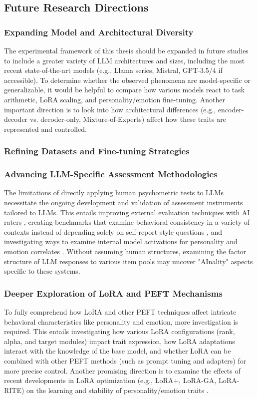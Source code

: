 \documentclass{DESSThesis}
\begin{document}
\subsection{Future Research Directions}

\subsubsection{Expanding Model and Architectural Diversity}
The experimental framework of this thesis should be expanded in future studies to include a greater variety of LLM architectures and sizes, including the most recent state-of-the-art models (e.g., Llama series, Mistral, GPT-3.5/4 if accessible). To determine whether the observed phenomena are model-specific or generalizable, it would be helpful to compare how various models react to task arithmetic, LoRA scaling, and personality/emotion fine-tuning. Another important direction is to look into how architectural differences (e.g., encoder-decoder vs. decoder-only, Mixture-of-Experts) affect how these traits are represented and controlled.

\subsubsection{Refining Datasets and Fine-tuning Strategies}


\subsubsection{Advancing LLM-Specific Assessment Methodologies}
The limitations of directly applying human psychometric tests to LLMs necessitate the ongoing development and validation of assessment instruments tailored to LLMs. This entails improving external evaluation techniques with AI raters \cite{zheng_lmlpa_2024}, creating benchmarks that examine behavioral consistency in a variety of contexts instead of depending solely on self-report style questions \cite{lee_llms_2024}, and investigating ways to examine internal model activations for personality and emotion correlates \cite{allbert_identifying_2025}. Without assuming human structures, examining the factor structure of LLM responses to various item pools may uncover "AInality" aspects specific to these systems.

\subsubsection{Deeper Exploration of LoRA and PEFT Mechanisms}
To fully comprehend how LoRA and other PEFT techniques affect intricate behavioral characteristics like personality and emotion, more investigation is required. This entails investigating how various LoRA configurations (rank, alpha, and target modules) impact trait expression, how LoRA adaptations interact with the knowledge of the base model, and whether LoRA can be combined with other PEFT methods (such as prompt tuning and adapters) for more precise control. Another promising direction is to examine the effects of recent developments in LoRA optimization (e.g., LoRA+, LoRA-GA, LoRA-RITE) on the learning and stability of personality/emotion traits \cite{hayou_lora_2024, wang_lora-ga_2024, yen_lora_2024}.
\end{document}
